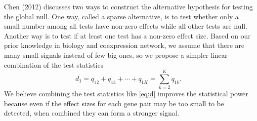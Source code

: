\documentclass[aoas,preprint]{imsart}
\numberwithin{equation}{section}
\theoremstyle{plain}
\begin{document}
Chen (2012) discusses two ways to construct the alternative hypothesis \cite{chen2012exponential} for testing the global null. One way, called a sparse alternative, is to test whether only a small number among all tests have non-zero effects while all other tests are null. Another way is to test if at least one test has a non-zero effect size. Based on our prior knowledge in biology and coexpression network, we assume that there are many small signals instead of few big ones, so we propose a simpler linear combination of the test statistics
\begin{equation}
d_1 = {q}_{12} + {q}_{13} + \cdots + {q}_{1K} = \sum_{k=2}^{K} {q}_{1k}.
\label{eq:d}
\end{equation}
We believe combining the test statistics like \ref{eq:d} improves the statistical power because even if the effect sizes for each gene pair may be too small to be detected, when combined they can form a stronger signal. \\
\end{document}
